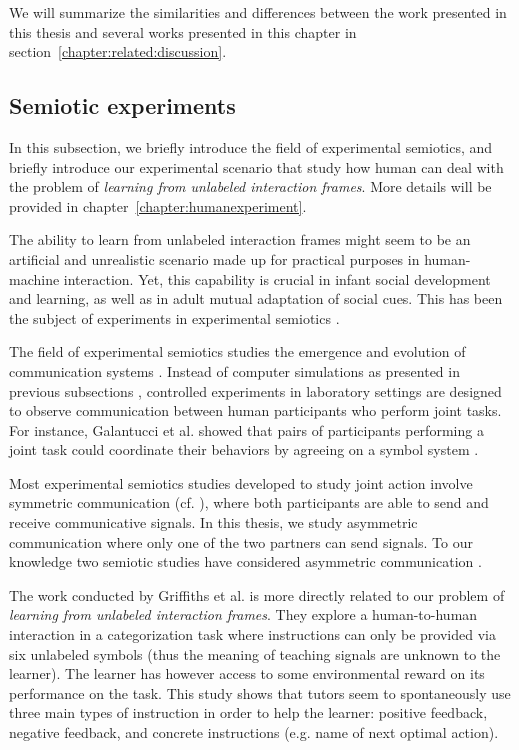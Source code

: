 We will summarize the similarities and differences between the work presented in this thesis and several works presented in this chapter in section~\ref{chapter:related:discussion}.

\subsection{Semiotic experiments} 

In this subsection, we briefly introduce the field of experimental semiotics, and briefly introduce our experimental scenario that study how human can deal with the problem of \emph{learning from unlabeled interaction frames}. More details will be provided in chapter~\ref{chapter:humanexperiment}.

The ability to learn from unlabeled interaction frames might seem to be an artificial and unrealistic scenario made up for practical purposes in human-machine interaction. Yet, this capability is crucial in infant social development and learning, as well as in adult mutual adaptation of social cues. This has been the subject of experiments in experimental semiotics \cite{galantucci2009experimental}. 

The field of experimental semiotics studies the emergence and evolution of communication systems \cite{galantucci2009experimental}. Instead of computer simulations as presented in previous subsections \cite{cangelosi2002simulating,steels2012experiments}, controlled experiments in laboratory settings are designed to observe communication between human participants who perform joint tasks. For instance, Galantucci et al. showed that pairs of participants performing a joint task could coordinate their behaviors by agreeing on a symbol system \cite{galantucci2005experimental}.

Most experimental semiotics studies developed to study joint action involve symmetric communication (cf. \cite{Galantucci2011experimental}), where both participants are able to send and receive communicative signals. In this thesis, we study asymmetric communication where only one of the two partners can send signals. To our knowledge two semiotic studies have considered asymmetric communication \cite{de2010exploring,griffiths2012bottom}. 

The work conducted by Griffiths et al. \cite{griffiths2012bottom} is more directly related to our problem of \emph{learning from unlabeled interaction frames}. They explore a human-to-human interaction in a categorization task where instructions can only be provided via six unlabeled symbols (thus the meaning of teaching signals are unknown to the learner). The learner has however access to some environmental reward on its performance on the task. This study shows that tutors seem to spontaneously use three main types of instruction in order to help the learner: positive feedback, negative feedback, and concrete instructions (e.g. name of next optimal action).


